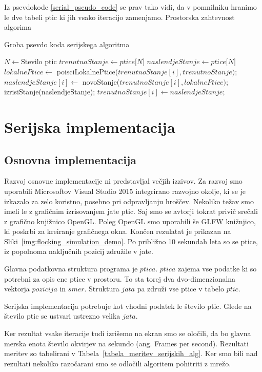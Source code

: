 \documentclass[a4paper, 12pt]{book}
\begin{document}
Iz psevdokode \ref{serial_pseudo_code} se prav tako vidi, da v pomnilniku hranimo le dve tabeli ptic ki jih vsako iteracijo zamenjamo. Prostorska zahtevnost algorima
\begin{algorithm}
\caption{Groba psevdo koda serijskega algoritma}\label{serial_pseudo_code}
\begin{algorithmic}[1]
\State $N \gets \text{Stevilo ptic}$
\State $trenutnoStanje \gets \textit{ptice[N]}$
\State $naslendjeStanje \gets \textit{ptice[N]}$
\Loop
{}
\State $lokalnePtice \gets$ poisciLokalnePtice($trenutnoStanje[i], trenutnoStanje);$
\State $naslendjeStanje[i] \gets$ novoStanje($trenutnoStanje[i], lokalnePtice);$
\EndFor
\State izrisiStanje(naslendjeStanje);
\State $trenutnoStanje[i] \gets naslendjeStanje;$
\EndLoop
\end{algorithmic}
\end{algorithm}

\chapter{Serijska implementacija}
\label{ch1}
\section{Osnovna implementacija}
Razvoj osnovne implementacije ni predstavljal večjih izzivov. Za razvoj smo uporabili Microsoftov Visual Studio 2015 integrirano razvojno okolje, ki se je izkazalo za zelo koristno, posebno pri odpravljanju hroščev. Nekoliko težav smo imeli le z grafičnim izrisovanjem jate ptic. Saj smo se avtorji tokrat privič srečali z grafično knjižnico OpenGL. Poleg OpenGL smo uporabili še GLFW knižnjico, ki poskrbi za kreiranje grafičnega okna. Končen rezulatat je prikazan na Sliki~\ref{img:flocking_simulation_demo}. Po približno 10 sekundah leta so se ptice, iz popolnoma naključnih pozicij združile v jate.

Glavna podatkovna struktura programa je $ptica$. $ptica$ zajema vse podatke ki so potrebni za opis ene ptice v prostoru. To sta torej dva dvo-dimenzionalna vektorja $pozicija$ in $smer$. Struktura $jata$ pa združi vse ptice v tabelo $ptic$.

Serijska implementacija potrebuje kot vhodni podatek le število ptic. Glede na število ptic se ustvari ustrezno velika $jata$.

Ker rezultat vsake iteracije tudi izrišemo na ekran smo se oločili, da bo glavna merska enota število okvirjev na sekundo (ang. Frames per second). Rezultati meritev so tabelirani v Tabela~\ref{tabela_meritev_serijskih_alg}. Ker smo bili nad rezultati nekoliko razočarani smo se odločili algoritem pohitriti z mrežo.
\end{document}
